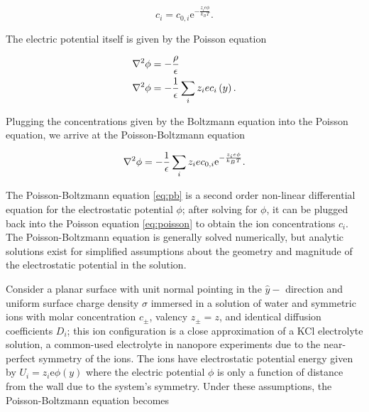 			
			
			\begin{equation} \label{eq:boltzmann}
				c_{i}=c_{0,i}\mathrm{e}^{-\frac{z_{i}e\phi}{k_{B}T}}.				
			\end{equation}
			
			The electric potential itself is given by the Poisson equation
			
			\begin{equation} \label{eq:poisson}
				\begin{split}
					\mathbf{\nabla}^{2}\phi & = -\frac{\rho}{\epsilon} \\
					\mathbf{\nabla}^{2}\phi & = -\frac{1}{\epsilon}\sum_{i}z_{i}ec_{i}\left(y\right).
				\end{split}
			\end{equation}
			
			Plugging the concentrations given by the Boltzmann equation into the Poisson equation, we arrive at the Poisson-Boltzmann equation
			
			\begin{equation} \label{eq:pb}
				\mathbf{\nabla}^{2}\phi=-\frac{1}{\epsilon}\sum_{i}z_{i}ec_{0,i}\mathrm{e}^{-\frac{z_{i}e\phi}{k_{B}T}}.
			\end{equation}
			
			The Poisson-Boltzmann equation \ref{eq:pb} is a second order non-linear differential equation for the electrostatic potential $\phi$; after solving for $\phi$, it can be plugged back into the Poisson equation \ref{eq:poisson} to obtain the ion concentrations $c_{i}$. The Poisson-Boltzmann equation is generally solved numerically, but analytic solutions exist for simplified assumptions about the geometry and magnitude of the electrostatic potential in the solution. 
			
			Consider a planar surface with unit normal pointing in the $\hat{y}-$ direction and uniform surface charge density $\sigma$ immersed in a solution of water and symmetric ions with molar concentration $c_{\pm}$, valency $z_{\pm}=z$, and identical diffusion coefficients $D_{i}$; this ion configuration is a close approximation of a KCl electrolyte solution, a common-used electrolyte in nanopore experiments due to the near-perfect symmetry of the ions. The ions have electrostatic potential energy given by $U_{i}=z_{i}\mathrm{e}\phi\left(y\right)$ where the electric potential $\phi$ is only a function of distance from the wall due to the system's symmetry. Under these assumptions, the Poisson-Boltzmann equation becomes
			
